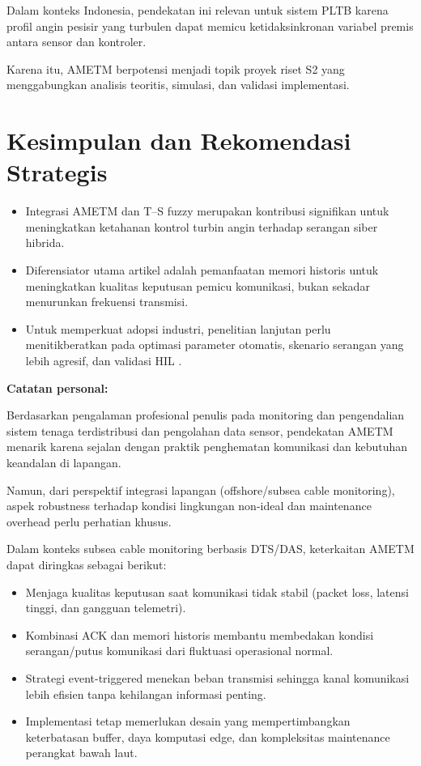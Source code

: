 \documentclass{article}
\begin{document}
Dalam konteks Indonesia, pendekatan ini relevan untuk sistem PLTB karena
profil angin pesisir yang turbulen dapat memicu ketidaksinkronan variabel
premis antara sensor dan kontroler.

Karena itu, AMETM berpotensi menjadi topik proyek riset S2 yang
menggabungkan analisis teoritis, simulasi, dan validasi implementasi.

\section*{Kesimpulan dan Rekomendasi Strategis}

\begin{itemize}[leftmargin=*]
    \item Integrasi AMETM dan T--S fuzzy merupakan kontribusi signifikan
    untuk meningkatkan ketahanan kontrol turbin angin terhadap serangan
    siber hibrida.

    \item Diferensiator utama artikel adalah pemanfaatan memori historis
    untuk meningkatkan kualitas keputusan pemicu komunikasi, bukan sekadar
    menurunkan frekuensi transmisi.

    \item Untuk memperkuat adopsi industri, penelitian lanjutan perlu
    menitikberatkan pada optimasi parameter otomatis, skenario serangan
    yang lebih agresif, dan validasi HIL \cite{tian2020memory}.
\end{itemize}

\vspace{0.5cm}
\noindent\textbf{Catatan personal:}

Berdasarkan pengalaman profesional penulis pada monitoring dan
pengendalian sistem tenaga terdistribusi dan pengolahan data sensor,
pendekatan AMETM menarik karena sejalan dengan praktik penghematan
komunikasi dan kebutuhan keandalan di lapangan.

Namun, dari perspektif integrasi lapangan (offshore/subsea cable
monitoring), aspek robustness terhadap kondisi lingkungan non-ideal dan
maintenance overhead perlu perhatian khusus.

Dalam konteks subsea cable monitoring berbasis DTS/DAS, keterkaitan AMETM
dapat diringkas sebagai berikut:

\begin{itemize}[leftmargin=*]
    \item Menjaga kualitas keputusan saat komunikasi tidak stabil
    (packet loss, latensi tinggi, dan gangguan telemetri).

    \item Kombinasi ACK dan memori historis membantu membedakan kondisi
    serangan/putus komunikasi dari fluktuasi operasional normal.

    \item Strategi event-triggered menekan beban transmisi sehingga kanal
    komunikasi lebih efisien tanpa kehilangan informasi penting.

    \item Implementasi tetap memerlukan desain yang mempertimbangkan
    keterbatasan buffer, daya komputasi edge, dan kompleksitas maintenance
    perangkat bawah laut.
\end{itemize}




\newpage
\appendix

\end{document}
